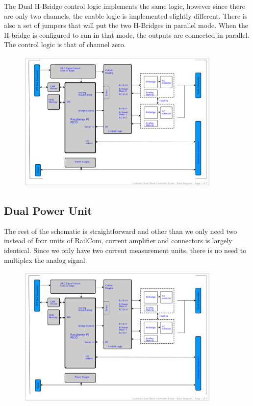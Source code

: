 The Dual H-Bridge control logic implements the same logic, however since there are only two channels, the enable logic is implemented slightly different. There is also a set of jumpers that will put the two H-Bridges in parallel mode. When the H-bridge is configured to run in that mode, the outputs are connected in parallel. The control logic is that of channel zero.

\begin{figure}[htbp]
    \centering
    \includegraphics[page=4, width=0.9\textwidth]{./Schematics/Schematic_LcsNodes-Dual-Block-Controller.pdf}
\end{figure}
\FloatBarrier

\subsection{Dual Power Unit}

The rest of the schematic is straightforward and other than we only need two instead of four units of RailCom, current amplifier and connectors is largely identical. Since we only have two current measurement units, there is no need to multiplex the analog signal. 

\begin{figure}[htbp]
    \centering
    \includegraphics[page=5, width=0.9\textwidth]{./Schematics/Schematic_LcsNodes-Dual-Block-Controller.pdf}
\end{figure}
\FloatBarrier


